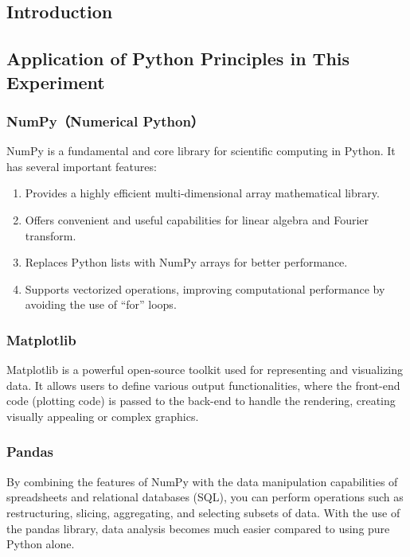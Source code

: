 \documentclass[12pt,a4paper]{article}
\begin{document}
\begin{CJK}{UTF8}{bkai}
\section{Introduction}

\subsection{Application of Python Principles in This Experiment}

\subsubsection{NumPy（Numerical Python）}
\hfill

NumPy is a fundamental and core library for scientific computing in Python. 
It has several important features:

\begin{enumerate}
    \item Provides a highly efficient multi-dimensional array mathematical library.
    \item Offers convenient and useful capabilities for linear algebra and Fourier transform.
    \item Replaces Python lists with NumPy arrays for better performance.
    \item Supports vectorized operations, improving computational performance by avoiding the use of “for” loops.
\end{enumerate}

\subsubsection{Matplotlib}
\hfill

Matplotlib is a powerful open-source toolkit used for representing and visualizing data. It allows users to define various output functionalities, where the front-end code (plotting code) is passed to the back-end to handle the rendering, creating visually appealing or complex graphics.

\subsubsection{Pandas}
\hfill

By combining the features of NumPy with the data manipulation capabilities of spreadsheets and relational databases (SQL), you can perform operations such as restructuring, slicing, aggregating, and selecting subsets of data. With the use of the pandas library, data analysis becomes much easier compared to using pure Python alone.


\end{CJK}
\end{document}
